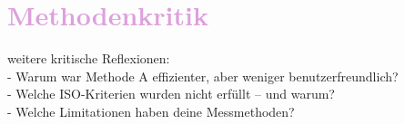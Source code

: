 \section{\textcolor{Plum}{Methodenkritik}}
weitere kritische Reflexionen:\\
- Warum war Methode A effizienter, aber weniger benutzerfreundlich?\\
- Welche ISO-Kriterien wurden nicht erfüllt – und warum?\\
- Welche Limitationen haben deine Messmethoden?



